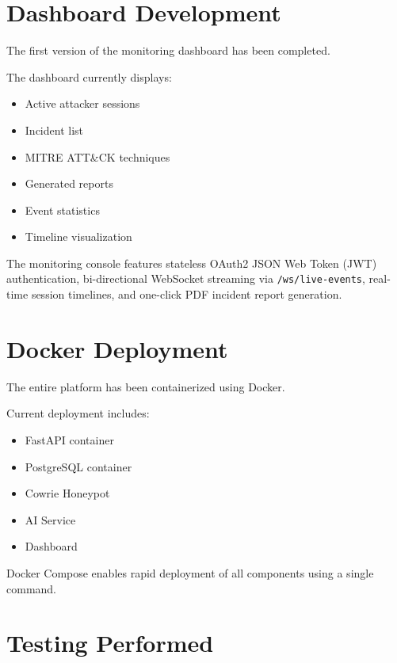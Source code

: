 \documentclass[12pt,a4paper]{report}
\begin{document}
\section{Dashboard Development}

The first version of the monitoring dashboard has been completed.

The dashboard currently displays:

\begin{itemize}
\item Active attacker sessions
\item Incident list
\item MITRE ATT\&CK techniques
\item Generated reports
\item Event statistics
\item Timeline visualization
\end{itemize}

The monitoring console features stateless OAuth2 JSON Web Token (JWT) authentication, bi-directional WebSocket streaming via \texttt{/ws/live-events}, real-time session timelines, and one-click PDF incident report generation.


\section{Docker Deployment}

The entire platform has been containerized using Docker.

Current deployment includes:

\begin{itemize}
\item FastAPI container
\item PostgreSQL container
\item Cowrie Honeypot
\item AI Service
\item Dashboard
\end{itemize}

Docker Compose enables rapid deployment of all components using a single command.


\section{Testing Performed}
\end{document}
